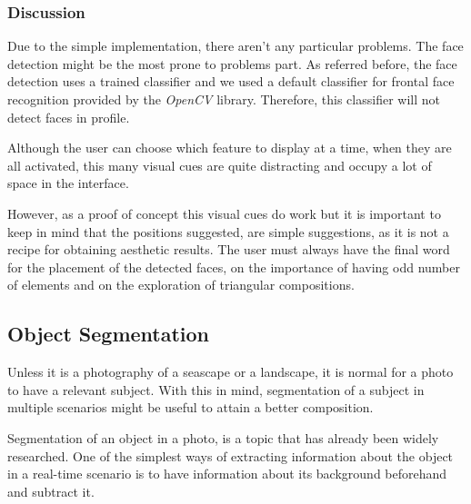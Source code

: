 \subsubsection{Discussion}

Due to the simple implementation, there aren't any particular problems. The face detection might be the most prone to problems part. As referred before, the face detection uses a trained classifier and we used a default classifier for frontal face recognition provided by the \emph{OpenCV} library. Therefore, this classifier will not detect faces in profile.

Although the user can choose which feature to display at a time, when they are all activated, this many visual cues are quite distracting and occupy a lot of space in the interface.

However, as a proof of concept this visual cues do work but it is important to keep in mind that the positions suggested, are simple suggestions, as it is not a recipe for obtaining aesthetic results. The user must always have the final word for the placement of the detected faces, on the importance of having odd number of elements and on the exploration of triangular compositions.

\subsection{Object Segmentation}
\label{sub:segmentation}

Unless it is a photography of a seascape or a landscape, it is normal for a photo to have a relevant subject. With this in mind, segmentation of a subject in multiple scenarios might be useful to attain a better composition.

Segmentation of an object in a photo, is a topic that has already been widely researched. One of the simplest ways of extracting information about the object in a real-time scenario is to have information about its background beforehand and subtract it. 


